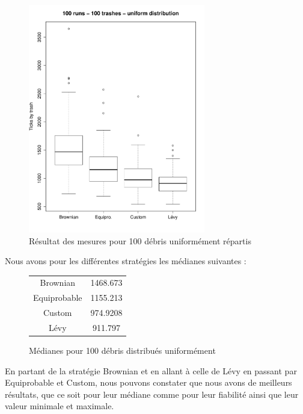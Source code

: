 
\begin{figure}[H]
	\begin{center}
		\includegraphics[height=10cm]{diagrams/100TrRnd_all.pdf}
		\caption{Résultat des mesures pour 100 débris uniformément répartis}
		\label{fig:100Trashes_Rnd}
	\end{center}
\end{figure}

Nous avons pour les différentes stratégies les médianes suivantes :

\begin{figure}[H]
	\begin{center}
		\begin{tabular}{ | c | c | }
			\hline
			Brownian & 1468.673 \\
			Equiprobable & 1155.213 \\
			Custom & 974.9208 \\
			Lévy & 911.797 \\
			\hline
		\end{tabular}
		\caption{Médianes pour 100 débris distribués uniformément}
	\end{center}
\end{figure}

En partant de la stratégie Brownian et en allant à celle de Lévy
en passant par Equiprobable et Custom, nous pouvons constater
que nous avons de meilleurs résultats, que ce soit pour leur médiane
comme pour leur fiabilité ainsi que leur valeur minimale et maximale.
